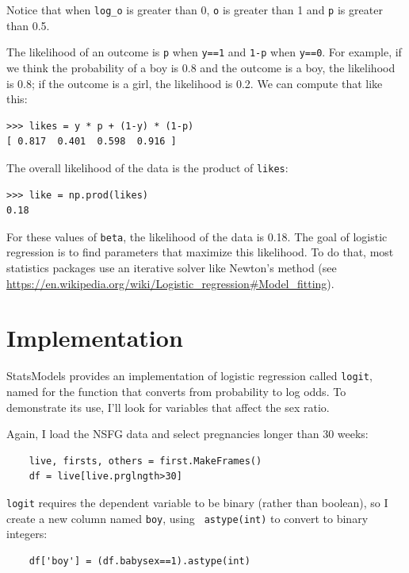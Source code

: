 \documentclass[12pt]{book}
\begin{document}
Notice that when \verb"log_o" is greater than 0, {\tt o}
is greater than 1 and {\tt p} is greater than 0.5.

The likelihood of an outcome is {\tt p} when {\tt y==1} and {\tt 1-p}
when {\tt y==0}.  For example, if we think the probability of a boy is
0.8 and the outcome is a boy, the likelihood is 0.8; if
the outcome is a girl, the likelihood is 0.2.  We can compute that
like this:

\begin{verbatim}
>>> likes = y * p + (1-y) * (1-p)
[ 0.817  0.401  0.598  0.916 ]
\end{verbatim}

The overall likelihood of the data is the product of {\tt likes}:

\begin{verbatim}
>>> like = np.prod(likes)
0.18
\end{verbatim}

For these values of {\tt beta}, the likelihood of the data is 0.18.
The goal of logistic regression is to find parameters that maximize
this likelihood.  To do that, most statistics packages use an
iterative solver like Newton's method (see
\url{https://en.wikipedia.org/wiki/Logistic_regression#Model_fitting}).


\section{Implementation}
\label{implementation}

StatsModels provides an implementation of logistic regression
called {\tt logit}, named for the function that converts from
probability to log odds.  To demonstrate its use, I'll look for
variables that affect the sex ratio.

Again, I load the NSFG data and select pregnancies longer than
30 weeks:

\begin{verbatim}
    live, firsts, others = first.MakeFrames()
    df = live[live.prglngth>30]
\end{verbatim}

{\tt logit} requires the dependent variable to be binary (rather than
boolean), so I create a new column named {\tt boy}, using {\tt
  astype(int)} to convert to binary integers:

\begin{verbatim}
    df['boy'] = (df.babysex==1).astype(int)
\end{verbatim}
\end{document}
